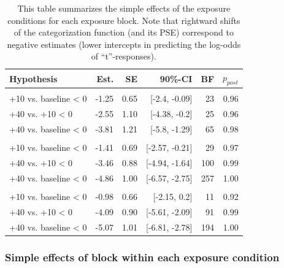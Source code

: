 \documentclass[
  11pt,
  man,mask,floatsintext]{apa6}
\begin{document}
\begin{table}[H]
\centering
\caption{\label{tab:hypothesis-table-exposure-simple-effects-condition}This table summarizes the simple effects of the exposure conditions for each exposure block. Note that rightward shifts of the categorization function (and its PSE) correspond to negative estimates (lower intercepts in predicting the log-odds of ``t''-responses).}
\centering
\begin{tabular}[t]{>{\raggedright\arraybackslash}p{15em}rrrrr}
\toprule
Hypothesis & Est. & SE & 90\%-CI & BF & $p_{post}$\\
\midrule
\addlinespace[0.3em]
\multicolumn{6}{l}{\textbf{Exposure block 1}}\\
\hspace{1em}+10 vs. baseline < 0 & -1.25 & 0.65 & {}[-2.4, -0.09] & 23 & 0.96\\
\hspace{1em}+40 vs. +10 < 0 & -2.55 & 1.10 & {}[-4.38, -0.2] & 25 & 0.96\\
\hspace{1em}+40 vs. baseline < 0 & -3.81 & 1.21 & {}[-5.8, -1.29] & 65 & 0.98\\
\addlinespace[0.3em]
\multicolumn{6}{l}{\textbf{Exposure block 2}}\\
\hspace{1em}+10 vs. baseline < 0 & -1.41 & 0.69 & {}[-2.57, -0.21] & 29 & 0.97\\
\hspace{1em}+40 vs. +10 < 0 & -3.46 & 0.88 & {}[-4.94, -1.64] & 100 & 0.99\\
\hspace{1em}+40 vs. baseline < 0 & -4.86 & 1.00 & {}[-6.57, -2.75] & 257 & 1.00\\
\addlinespace[0.3em]
\multicolumn{6}{l}{\textbf{Exposure block 3}}\\
\hspace{1em}+10 vs. baseline < 0 & -0.98 & 0.66 & {}[-2.15, 0.2] & 11 & 0.92\\
\hspace{1em}+40 vs. +10 < 0 & -4.09 & 0.90 & {}[-5.61, -2.09] & 91 & 0.99\\
\hspace{1em}+40 vs. baseline < 0 & -5.07 & 1.01 & {}[-6.81, -2.78] & 194 & 1.00\\
\bottomrule
\end{tabular}
\end{table}

\subsubsection{Simple effects of block within each exposure condition}\label{simple-effects-of-block-within-each-exposure-condition}
\end{document}

